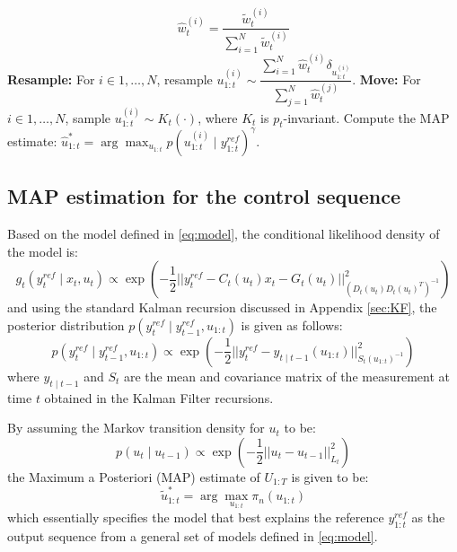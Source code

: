 \begin{algorithm}
\begin{algorithmic}[1]
\begin{equation*}
\hat{w}^{(i)}_t = \dfrac{\tilde{w}^{(i)}_t}{\sum^N_{i=1} \tilde{w}^{(i)}_t}
\end{equation*}
\State \textbf{Resample:} For $i \in 1, \ldots, N$, resample $ u^{(i)}_{1:t} \sim \dfrac{\sum^N_{i=1}\hat{w}^{(i)}_t\delta_{u^{(i)}_{1:t}}}{\sum^N_{j=1} \hat{w}^{(j)}_t}$.
\State \textbf{Move:} For $i \in 1, \ldots, N$, sample $u^{(i)}_{1:t} \sim K_t(\cdot)$, where $K_t$ is $p_t$-invariant.
\EndWhile
\State Compute the MAP estimate: $\hat{u}^*_{1:t} =  \arg\max_{u_{1:t}} p(u^{(i)}_{1:t} \mid y^{ref}_{1:t})^\gamma$.
\EndFunction
\end{algorithmic}
\end{algorithm}

\subsection{MAP estimation for the control sequence}
Based on the model defined in \eqref{eq:model}, the conditional likelihood density of the model is:
\begin{equation}
  g_t(y^{ref}_t \mid x_t, u_t) \propto \exp\left( -\dfrac{1}{2} \vert\vert y^{ref}_t - C_t(u_t)x_t - G_t(u_t) \vert\vert^2_{(D_t(u_t)D_t(u_t)^T)^{-1}}\right)
\end{equation}
and using the standard Kalman recursion discussed in Appendix \ref{sec:KF}, the posterior distribution $p(y^{ref}_t \mid y^{ref}_{t-1}, u_{1:t})$ is given as follows:
\begin{equation}
  p(y^{ref}_t \mid y^{ref}_{t-1}, u_{1:t}) \propto \exp\left( -\dfrac{1}{2} \vert\vert y^{ref}_t - y_{t \mid t-1}(u_{1:t}) \vert\vert^2_{S_t(u_{1:t})^{-1}}\right)
\end{equation}
where $y_{t \mid t-1}$ and $S_t$ are the mean and covariance matrix of the measurement at time $t$ obtained in the Kalman Filter recursions.

By assuming the Markov transition density for $u_t$ to be:
\begin{equation}
  p(u_{t} \mid u_{t-1}) \propto  \exp\left( -\dfrac{1}{2} \vert\vert u_t - u_{t-1} \vert\vert^2_{L_t}\right)
\label{eq:mctrans}
\end{equation}
the Maximum a Posteriori (MAP) estimate of $U_{1:T}$ is given to be:
\begin{equation}
  \tilde{u}^*_{1:t} = \arg\max_{u_{1:t}} \pi_n(u_{1:t})
\label{eq:map}
\end{equation}
which essentially specifies the model that best explains the reference $y^{ref}_{1:t}$ as the output sequence from a general set of models defined in \eqref{eq:model}.

